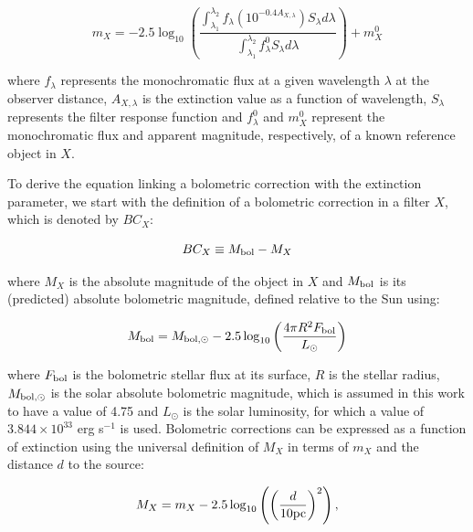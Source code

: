 \documentclass[12pt, a4paper]{report}
\begin{document}
\begin{equation}
m_{X} = -2.5 \log_{10} \left(\frac{ \int_{\lambda_{1}}^{\lambda_{2}} f_{\lambda} \left( 10^{-0.4 A_{X,\lambda}} \right) S_{\lambda} d\lambda }{ \int_{\lambda_{1}}^{\lambda_{2}} f_{\lambda}^{0} S_{\lambda} d\lambda }\right) + m_{X}^{0}
\label{app_mag_def}
\end{equation}

where $f_{\lambda}$ represents the monochromatic flux at a given wavelength $\lambda$ at the observer distance, $A_{X,\lambda}$ is the extinction value as a function of wavelength, $S_{\lambda}$ represents the filter response function and $f_{\lambda}^{0}$ and $m_{X}^{0}$ represent the monochromatic flux and apparent magnitude, respectively, of a known reference object in $X$.


To derive the equation linking a bolometric correction with the extinction parameter, we start with the definition of a bolometric correction in a filter $X$, which is denoted by $BC_{X}$:

\begin{equation}
BC_{X} \equiv M_{\textnormal{bol}} - M_{X}
\label{BC_def}
\end{equation}

where $M_{X}$ is the absolute magnitude of the object in $X$ and $M_{\textnormal{bol}}$ is its (predicted) absolute bolometric magnitude, defined relative to the Sun using:

\begin{equation}
M_{\textnormal{bol}} = M_{\textnormal{bol},\odot} - 2.5 \log_{10} \left( \frac{4\pi R^{2}F_{\textnormal{bol}}}{L_{\odot}} \right)
\label{mbol_sun}
\end{equation}

where  $F_{\textnormal{bol}}$ is the bolometric stellar flux at its surface, $R$ is the stellar radius, $M_{\textnormal{bol},\odot}$ is the solar absolute bolometric magnitude, which is assumed in this work to have a value of 4.75 and $L_{\odot}$ is the solar luminosity, for which a value of $3.844 \times 10^{33}$ erg s$^{-1}$ is used. Bolometric corrections can be expressed as a function of extinction using the universal definition of $M_{X}$ in terms of $m_{X}$ and the distance $d$ to the source:

\begin{equation}
M_{X} = m_{X} - 2.5 \log_{10}\left( \left( \frac{d}{10 \textnormal{pc}} \right)^{2} \right),
\label{abs_mag_def}
\end{equation}
\end{document}
